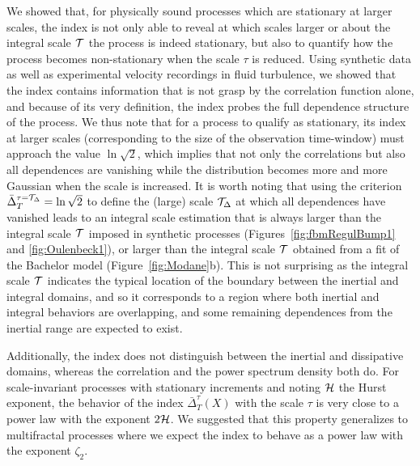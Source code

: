 \documentclass[aps,pra,groupedaddress,notitlepage]{revtex4-1}
\begin{document}
We showed that, for physically sound processes which are stationary at larger scales, the index is not only able to reveal at which scales larger or about the integral scale ${\cal T}$ the process is indeed stationary, but also to quantify how the process becomes non-stationary when the scale $\tau$ is reduced. Using synthetic data as well as experimental velocity recordings in fluid turbulence, we showed that the index contains information that is not grasp by the correlation function alone, and because of its very definition, the index probes the full dependence structure of the process. We thus note that for a process to qualify as stationary, its index at larger scales (corresponding to the size of the observation time-window) must approach the value $\ln\sqrt{2}$, which implies that not only the correlations but also all dependences are vanishing {while the distribution becomes more and more Gaussian when the scale is increased}.
It is worth noting that using the criterion $\bar{\Delta}_T^{\tau={\cal T}_\Delta}=\ln\sqrt{2}$ to define the (large) scale ${\cal T}_\Delta$ at which all dependences have vanished leads to an integral scale estimation that is always larger than the integral scale ${\cal T}$ imposed in synthetic processes (Figures~\ref{fig:fbmRegulBump1} and \ref{fig:Oulenbeck1}), or larger than the integral scale ${\cal T}$ obtained from a fit of the Bachelor model (Figure~\ref{fig:Modane}b). This is not surprising as the integral scale ${\cal T}$ indicates the typical location of the boundary between the inertial and integral domains, and so it corresponds to a region where both inertial and integral behaviors are overlapping, and some remaining dependences from the inertial range are expected to exist.

Additionally, the index does not distinguish between the inertial and dissipative domains, whereas the correlation and the power spectrum density both do. 
For scale-invariant processes with stationary increments and noting ${\cal H}$ the Hurst exponent, the behavior of the index $\bar{\Delta}_T^{\tau}(X)$ with the scale $\tau$ is very close to a power law with the exponent $2{\cal H}$. We suggested that this property generalizes to multifractal processes where we expect the index to behave as a power law with the exponent $\zeta_2$.
\end{document}
